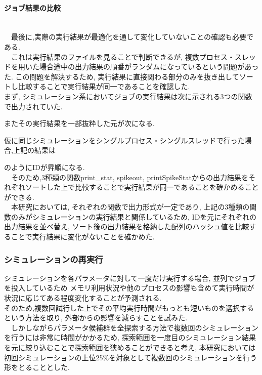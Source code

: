 \paragraph{ジョブ結果の比較}~\\
　最後に,実際の実行結果が最適化を通して変化していないことの確認も必要である.\\
　これは実行結果のファイルを見ることで判断できるが, 複数プロセス・スレッドを用いた場合途中の出力結果の順番がランダムになっているという問題があった.
この問題を解決するため, 実行結果に直接関わる部分のみを抜き出してソートし比較することで実行結果が同一であることを確認した.\\
まず, シミュレーション系においてジョブの実行結果は次に示される3つの関数で出力されていた.\\
{\footnotesize

}
またその実行結果を一部抜粋した元が次になる.\\
{\footnotesize

}
仮に同じシミュレーションをシングルプロセス・シングルスレッドで行った場合,上記の結果は
{\footnotesize

}
のようにIDが昇順になる.\\
　そのため,3種類の関数print\_stat, spikeout, printSpikeStatからの出力結果をそれぞれソートした上で比較することで実行結果が同一であることを確かめることができる.\\
　本研究においては, それぞれの関数で出力形式が一定であり, 上記の3種類の関数のみがシミュレーションの実行結果と関係しているため,
IDを元にそれぞれの出力結果を並べ替え, ソート後の出力結果を格納した配列のハッシュ値を比較することで実行結果に変化がないことを確かめた.\\
{\footnotesize

}

\subsubsection{シミュレーションの再実行}
シミュレーションを各パラメータに対して一度だけ実行する場合, 並列でジョブを投入しているため
メモリ利用状況や他のプロセスの影響も含めて実行時間が状況に応じてある程度変化することが予測される.\\
 そのため,複数回試行した上でその平均実行時間がもっとも短いものを選択するという方法を取り,
外部からの影響を減らすことを試みた.\\
　しかしながらパラメータ候補群を全探索する方法で複数回のシミュレーションを行うには非常に時間がかかるため,
探索範囲を一度目のシミュレーション結果を元に絞り込むことで探索範囲を狭めることができると考え,
本研究においては初回シミュレーションの上位25\%を対象として複数回のシミュレーションを行う形をとることとした.\\
